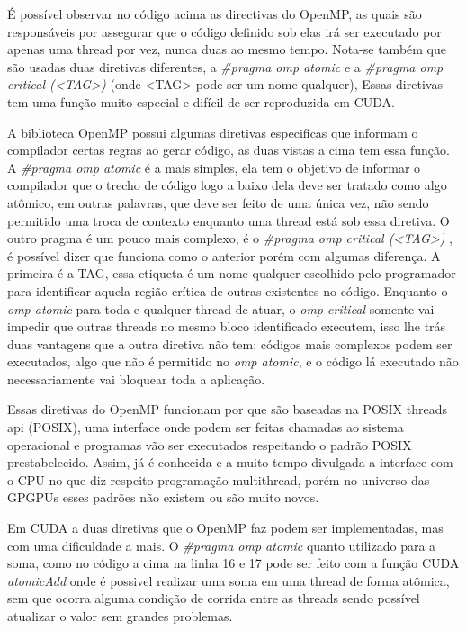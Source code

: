     É possível observar no código acima as directivas do OpenMP, as quais são responsáveis por assegurar que o código definido sob elas irá ser executado por apenas uma thread por vez, nunca duas ao mesmo tempo. Nota-se também que são usadas duas diretivas diferentes, a \textit{\#pragma omp atomic} e a \textit{\#pragma omp critical (<TAG>) } (onde <TAG> pode ser um nome qualquer), Essas diretivas tem uma função muito especial e difícil de ser reproduzida em CUDA.

    A biblioteca OpenMP possui algumas diretivas especificas que informam o compilador certas regras ao gerar código, as duas vistas a cima tem essa função. A \textit{\#pragma omp atomic} é a mais simples, ela tem o objetivo de informar o compilador que o trecho de código logo a baixo dela deve ser tratado como algo atômico, em outras palavras, que deve ser feito de uma única vez, não sendo permitido uma troca de contexto enquanto uma thread está sob essa diretiva. O outro pragma é um pouco mais complexo, é o \textit{\#pragma omp critical (<TAG>) }, é possível  dizer que funciona como o anterior porém com algumas diferença. A primeira é a TAG, essa etiqueta é um nome qualquer escolhido pelo programador para identificar aquela região crítica de outras existentes no código. Enquanto o \textit{omp atomic} para toda e qualquer thread de atuar, o \textit{omp critical} somente vai impedir que outras threads no mesmo bloco identificado executem, isso lhe trás duas vantagens que a outra diretiva não tem: códigos mais complexos podem ser executados, algo que não é permitido no \textit{omp atomic}, e o código lá executado não necessariamente vai bloquear toda a aplicação.

    Essas diretivas do OpenMP funcionam por que são baseadas na POSIX threads api (POSIX), uma interface onde podem ser feitas chamadas ao sistema operacional e programas vão ser executados respeitando o padrão POSIX prestabelecido. Assim, já é conhecida e a muito tempo divulgada a interface com o CPU no que diz respeito programação multithread, porém no universo das GPGPUs esses padrões não existem ou são muito novos.

    Em CUDA a duas diretivas que o OpenMP faz podem ser implementadas, mas com uma dificuldade a mais. O \textit{\#pragma omp atomic} quanto utilizado para a soma, como no código a cima na linha 16 e 17 pode ser feito com a função CUDA \textit{atomicAdd} onde é possivel realizar uma soma em uma thread de forma atômica, sem que ocorra alguma condição de corrida entre as threads sendo possível atualizar o valor sem grandes problemas.

